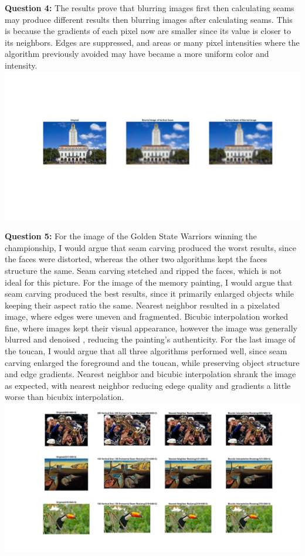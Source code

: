 \documentclass[11pt]{article}
\begin{document}
    \textbf{Question 4:}\newline
    The results prove that blurring images first then calculating seams may
    produce different results then blurring images after calculating seams.
    This is because the gradients of each pixel now are smaller since its
    value is closer to its neighbors. Edges are suppressed, and areas or many pixel intensities where the algorithm previously avoided may have
    became a more uniform color and intensity.\newline
    \includegraphics[width=\linewidth]{Part 2 Pictures/question4}\newline

    \textbf{Question 5:}\newline
    For the image of the Golden State Warriors winning the championship, I would argue that seam carving produced the worst results, since the
    faces were distorted, whereas the other two algorithms kept the faces structure the same. Seam carving stetched and ripped the faces, which is
    not ideal for this picture. For the image of the memory painting, I would argue that seam carving produced the best results, since it primarily
    enlarged objects while keeping their aspect ratio the same. Nearest neighbor resulted in a pixelated image, where edges were uneven and
    fragmented. Bicubic interpolation worked fine, where images kept their visual appearance, however the image was generally blurred and denoised
    , reducing the painting's authenticity. For the last image of the toucan, I would argue that all three algorithms performed well, since seam
    carving enlarged the foreground and the toucan, while preserving object structure and edge gradients. Nearest neighbor and bicubic
    interpolation shrank the image as expected, with nearest neighbor reducing edege quality and gradients a little worse than bicubix
    interpolation.\newline
    \includegraphics[width=\linewidth]{Part 2 Pictures/question5}\newline
\end{document}
